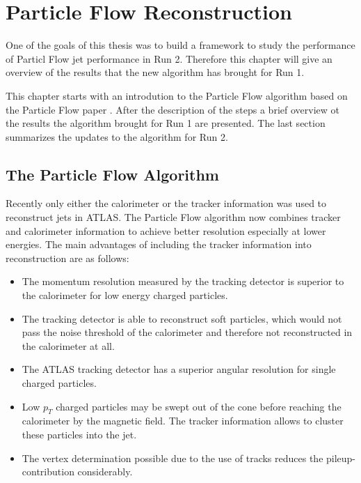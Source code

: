 \chapter{Particle Flow Reconstruction}

One of the goals of this thesis was to build a framework to study the performance of Particl Flow jet performance in Run 2. Therefore this chapter will give an overview of the results that the new algorithm has brought for Run 1.

This chapter starts with an introdution to the Particle Flow algorithm based on the Particle Flow paper \cite{pflow16}. After the description of the steps a brief overview ot the results the algorithm brought for Run 1 are presented. The last section summarizes the updates to the algorithm for Run 2.

\section{The Particle Flow Algorithm}

Recently only either the calorimeter or the tracker information was used to reconstruct jets in ATLAS. The Particle Flow algorithm now combines tracker and calorimeter information to achieve better resolution especially at lower energies. The main advantages of including the tracker information into reconstruction are as follows:


\begin{itemize}
\item The momentum resolution measured by the tracking detector is superior to the calorimeter for low energy charged particles.
\item The tracking detector is able to reconstruct soft particles, which would not pass the noise threshold of the calorimeter and therefore not reconstructed in the calorimeter at all.
\item The ATLAS tracking detector has a superior angular resolution for single charged particles.
\item Low $p_T$ charged particles may be swept out of the cone before reaching the calorimeter by the magnetic field. The tracker information allows to cluster these particles into the jet.
\item The vertex determination possible due to the use of tracks reduces the pileup-contribution considerably.
\end{itemize}

